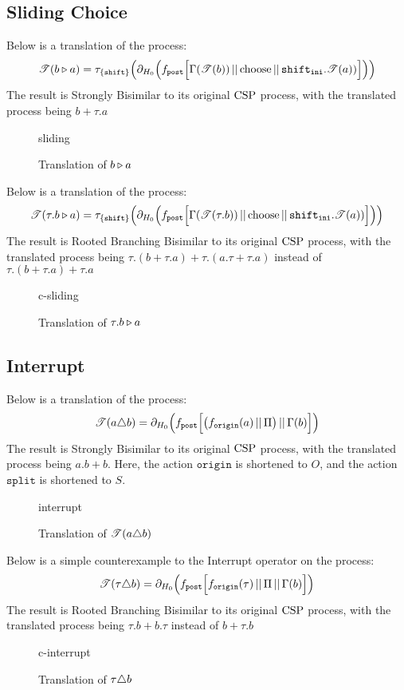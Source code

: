 \documentclass[../hons_project.tex]{subfiles}
\begin{document}
\subsection{Sliding Choice}
Below is a translation of the process:
\[\mathscr{T}(b \triangleright a)    = \tau_{\{\mathtt{shift}\}}\Bigl(\partial_{H_{0}}\Bigl(f_{\mathtt{post}}\Bigl[ \Gamma(\mathscr{T}(b)) \,\vert\vert\, \mathrm{choose} \,\vert\vert\, \mathtt{shift}_{\mathtt{ini}} . \mathscr{T}(a)) \Bigr]\Bigr)\Bigr)\]
The result is Strongly Bisimilar to its original $\mathrm{CSP}$ process, with the translated process being $b + \tau.a$
\begin{figure}[H]
	{sliding}
	\caption{Translation of $b \triangleright a$}
\end{figure}
Below is a translation of the process:
\[\mathscr{T}(\tau.b \triangleright a)= \tau_{\{\mathtt{shift}\}}\Bigl(\partial_{H_{0}}\Bigl(f_{\mathtt{post}}\Bigl[ \Gamma(\mathscr{T}(\tau.b)) \,\vert\vert\, \mathrm{choose} \,\vert\vert\, \mathtt{shift}_{\mathtt{ini}} . \mathscr{T}(a)) \Bigr]\Bigr)\Bigr)\]
The result is Rooted Branching Bisimilar to its original $\mathrm{CSP}$ process, with the translated process being $\tau.(b+\tau.a) + \tau.(a.\tau+\tau.a)$ instead of $\tau.(b+\tau.a) + \tau.a$

\begin{figure}[H]
	{c-sliding}
	\caption{Translation of $\tau.b \triangleright a$}
\end{figure}


\subsection{Interrupt}
Below is a translation of the process:
\[\mathscr{T}(a \triangle b) = \partial_{H_{0}}\Bigl(f_{\mathtt{post}}\Bigl[ \bigl(f_{\mathtt{origin}}(a) \,\vert\vert\, \Pi\bigr) \,\vert\vert\, \Gamma(b) \Bigr]\Bigr)\]
The result is Strongly Bisimilar to its original $\mathrm{CSP}$ process, with the translated process being $a.b + b$. Here, the action $\mathtt{origin}$ is shortened to $O$, and the action $\mathtt{split}$ is shortened to $S$.

\begin{figure}[H]
	{interrupt}
	\caption{Translation of $\mathscr{T}(a \triangle b)$}\end{figure}

Below is a simple counterexample to the Interrupt operator on the process:
\[\mathscr{T}(\tau \triangle b) = \partial_{H_{0}}\Bigl(f_{\mathtt{post}}\Bigl[ f_{\mathtt{origin}}(\tau) \,\vert\vert\, \Pi \,\vert\vert\, \Gamma(b) \Bigr]\Bigr)\]
The result is Rooted Branching Bisimilar to its original $\mathrm{CSP}$ process, with the translated process being $\tau.b + b.\tau$ instead of $b + \tau.b$
\begin{figure}[H]
	\centering
	{c-interrupt}
	\caption{Translation of $\tau \triangle b$}
\end{figure}
\end{document}
